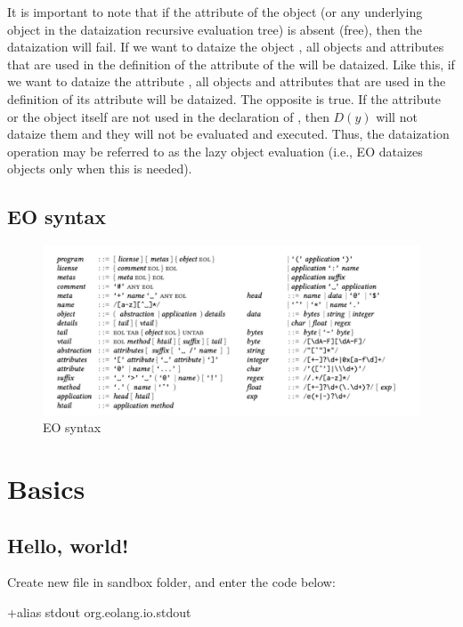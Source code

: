 \documentclass[12pt]{book}
\begin{document}
{It is important to note that if the  attribute of the object (or any underlying object in the dataization recursive evaluation tree) is absent (free), then the dataization will fail.
If we want to dataize the object , all objects and attributes that are used in the definition of the  attribute of the  will be dataized. Like this, if we want to dataize the attribute , all objects and attributes that are used in the definition of its  attribute will be dataized.
The opposite is true. If the attribute  or the object  itself are not used in the declaration of , then $D(y)$ will not dataize them and they will not be evaluated and executed. Thus, the dataization operation may be referred to as the lazy object evaluation (i.e., EO dataizes objects only when this is needed).


\section{EO syntax}
\begin{figure}[ht]
  \centering
  \includegraphics[width=1\textwidth,]{EOsyntxax.jpg}
  \caption{EO syntax}
  \label{fig:uml1}
\end{figure}


\chapter{Basics}

\section{Hello, world!}
Create new file  in sandbox folder, and enter the code below:

\begin{ffcode}
+alias stdout org.eolang.io.stdout


\end{ffcode}}
\end{document}
